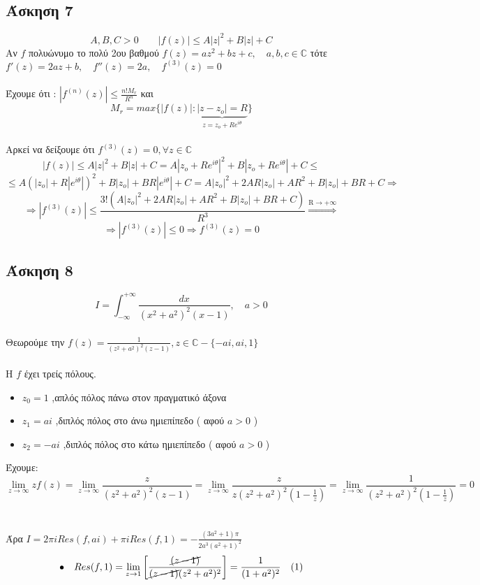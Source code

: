 \documentclass[12pt]{article}
\begin{document}
 \subsection{Άσκηση 7}
$$
A,B,C > 0  \qquad |f(z)|\leqslant A|z|^2+B|z|+C
$$
Αν $f$ πολυώνυμο το πολύ 2ου βαθμού 
$f(z)=az^2+bz+c,\quad a,b,c\in \mathbb{C}$ τότε 
$f'(z)=2az+b,\quad f''(z)=2a ,\quad f^{(3)}(z)=0
$
\\\\Έχουμε ότι : $|f^{(n)}(z)|\leqslant \frac{n!M_r}{R^n}$ και 
\[
M_r=max\{|f(z)|:
\underbrace{|z-z_o|=R}_{\text{$z=z_o+Re^{i\theta}$}}
\}
\]
\\
Αρκεί να δείξουμε ότι $f^{(3)}(z)=0,\forall z \in \mathbb{C}$
$$
|f(z)|\leqslant A|z|^2+B|z|+C=A|z_o+Re^{i\theta}|^2+B|z_o+Re^{i\theta}|+C
\leqslant$$$$
\leqslant
A(|z_o|+R|e^{i\theta}|)^2+B|z_o|+BR|e^{i\theta}|+C=
A|z_o|^2+2AR|z_o|+AR^2+B|z_o|+BR+C
\Rightarrow$$
$$\Rightarrow
|f^{(3)}(z)|\leqslant\frac{3!(
A|z_o|^2+2AR|z_o|+AR^2+B|z_o|+BR+C)}{R^3}
\overset{\mathrm{R\rightarrow +\infty}}{\Rightarrow}
$$
$$
\Rightarrow
|f^{(3)}(z)|\leqslant0 \Rightarrow f^{(3)}(z)
=0
$$
\newpage
 \subsection{Άσκηση 8}
$$
I=\int_{-\infty}^{+\infty}\frac{dx}{(x^2+a^2)^2(x-1)},\quad a>0
$$ \\
Θεωρούμε την $f(z)=\frac{1}{(z^2+a^2)^2(z-1)},z\in \mathbb{C}-\{-a i,a i,1 \}
$
\\  \\
Η $f$ έχει τρείς πόλους.
\begin{itemize}
\item $z_0=1$ ,απλός πόλος πάνω στον πραγματικό άξονα
\item $z_1=ai$ ,διπλός πόλος στο άνω ημιεπίπεδο ( αφού $a>0$ )
\item $z_2=-ai$ ,διπλός πόλος στο κάτω ημιεπίπεδο ( αφού $a>0$ )
\\
\end{itemize}

Έχουμε: 
$$\lim_{z \rightarrow \infty} zf(z)=\lim_{z \rightarrow \infty} \frac{z}{(z^2+a^2)^2(z-1)}=\lim_{z \rightarrow \infty} \frac{z}{z(z^2+a^2)^2(1-\frac{1}{z})}=\lim_{z \rightarrow \infty} \frac{1}{(z^2+a^2)^2(1-\frac{1}{z})}=0$$
\\ \\
Άρα $I=2\pi i Res(f,ai)+\pi i Res(f,1)= -\frac{(3a^2+1)\pi}{2a^3(a^2+1)^2}$
\\
$$ \bullet\quad Res(f,1)=\lim_{z \rightarrow 1}\left[\frac{\cancel{(z-1)}}{\cancel{(z-1)}(z^2+a^2)^2}\right]=\frac{1}{(1+a^2)^2}
\quad(1)$$
\end{document}
